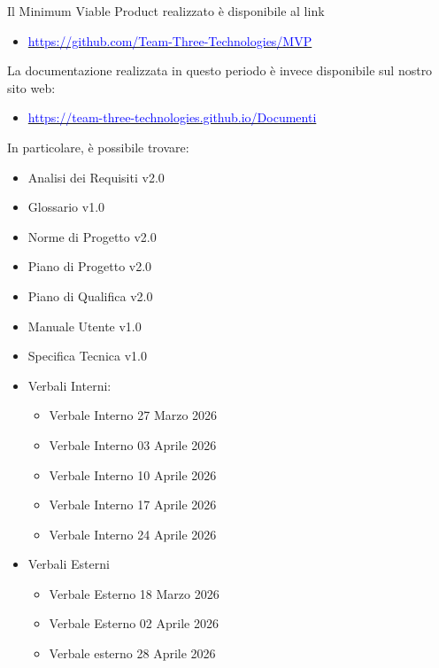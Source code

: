 \documentclass[a4paper,12pt]{article}
\begin{document}
Il Minimum Viable Product realizzato è disponibile al link
\begin{itemize}
    \item \href{https://github.com/Team-Three-Technologies/MVP}{\textcolor{blue} {https://github.com/Team-Three-Technologies/MVP}}
\end{itemize}

La documentazione realizzata in questo periodo è invece disponibile sul nostro sito web: 

\begin{itemize}
    \item \href{https://team-three-technologies.github.io/Documenti}{\textcolor{blue} {https://team-three-technologies.github.io/Documenti}}
\end{itemize}

In particolare, è possibile trovare: 
\begin{itemize}
    \item Analisi dei Requisiti v2.0
    \item Glossario v1.0
    \item Norme di Progetto v2.0
    \item Piano di Progetto v2.0
    \item Piano di Qualifica v2.0
    \item Manuale Utente v1.0
    \item Specifica Tecnica v1.0
    \item Verbali Interni: 
    \begin{itemize}
        \item Verbale Interno 27 Marzo 2026
        \item Verbale Interno 03 Aprile 2026
        \item Verbale Interno 10 Aprile 2026
        \item Verbale Interno 17 Aprile 2026
        \item Verbale Interno 24 Aprile 2026
    \end{itemize}
    \item Verbali Esterni
    \begin{itemize}
        \item Verbale Esterno 18 Marzo 2026
        \item Verbale Esterno 02 Aprile 2026
        \item Verbale esterno 28 Aprile 2026
    \end{itemize}
\end{itemize}
\end{document}
